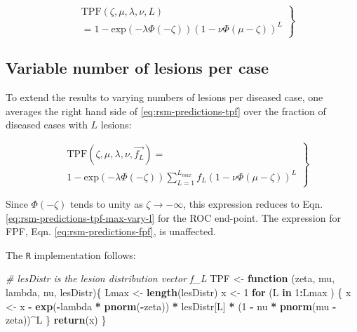 \documentclass[
]{book}
\newenvironment{Shaded}{\begin{snugshade}}{\end{snugshade}}
\newcommand{\CommentTok}[1]{\textcolor[rgb]{0.56,0.35,0.01}{\textit{#1}}}
\newcommand{\ControlFlowTok}[1]{\textcolor[rgb]{0.13,0.29,0.53}{\textbf{#1}}}
\newcommand{\DecValTok}[1]{\textcolor[rgb]{0.00,0.00,0.81}{#1}}
\newcommand{\KeywordTok}[1]{\textcolor[rgb]{0.13,0.29,0.53}{\textbf{#1}}}
\newcommand{\NormalTok}[1]{#1}
\newcommand{\OperatorTok}[1]{\textcolor[rgb]{0.81,0.36,0.00}{\textbf{#1}}}
\newcommand{\StringTok}[1]{\textcolor[rgb]{0.31,0.60,0.02}{#1}}
\begin{document}
\begin{equation}
\left.
\begin{aligned}
& \text{TPF}\left (\zeta , \mu, \lambda, \nu, L \right ) \\
&= 1 - \text{exp}\left ( - \lambda \Phi \left ( - \zeta \right )\right )
\left ( 1 - \nu \Phi \left ( \mu - \zeta \right ) \right )^L
\end{aligned}
\right \}
\label{eq:rsm-predictions-tpf}
\end{equation}

\hypertarget{rsm-predictions-tpf-varying-lesions}{%
\subsection{Variable number of lesions per case}\label{rsm-predictions-tpf-varying-lesions}}

To extend the results to varying numbers of lesions per diseased case, one averages the right hand side of \eqref{eq:rsm-predictions-tpf} over the fraction of diseased cases with \(L\) lesions:

\begin{equation}
\left.
\begin{aligned}
& \text{TPF}\left (\zeta , \mu, \lambda, \nu, \overrightarrow{f_L} \right ) =  \\
& 1 - \text{exp}\left ( -\lambda \Phi \left ( -\zeta \right )\right ) 
\sum_{L=1}^{L_{max}} f_L  \left ( 1 - \nu \Phi \left ( \mu -\zeta \right ) \right )^L 
\end{aligned}
\right \}
\label{eq:rsm-predictions-tpf2}
\end{equation}

Since \(\Phi \left ( -\zeta \right )\) tends to unity as \(\zeta \rightarrow -\infty\), this expression reduces to Eqn. \eqref{eq:rsm-predictions-tpf-max-vary-l} for the ROC end-point. The expression for FPF, Eqn. \eqref{eq:rsm-predictions-fpf}, is unaffected.

The \texttt{R} implementation follows:

\begin{Shaded}
\begin{Highlighting}[]
\CommentTok{# lesDistr is the lesion distribution vector f_L}
\NormalTok{TPF <-}\StringTok{ }\ControlFlowTok{function}\NormalTok{ (zeta, mu, lambda, nu, lesDistr)\{}
\NormalTok{  Lmax <-}\StringTok{ }\KeywordTok{length}\NormalTok{(lesDistr)}
\NormalTok{  x <-}\StringTok{ }\DecValTok{1}
  \ControlFlowTok{for}\NormalTok{ (L }\ControlFlowTok{in} \DecValTok{1}\OperatorTok{:}\NormalTok{Lmax ) \{}
\NormalTok{    x <-}\StringTok{ }\NormalTok{x }\OperatorTok{-}\StringTok{ }\KeywordTok{exp}\NormalTok{(}\OperatorTok{-}\NormalTok{lambda }\OperatorTok{*}\StringTok{ }\KeywordTok{pnorm}\NormalTok{(}\OperatorTok{-}\NormalTok{zeta)) }\OperatorTok{*}\StringTok{ }
\StringTok{      }\NormalTok{lesDistr[L] }\OperatorTok{*}\StringTok{ }\NormalTok{(}\DecValTok{1} \OperatorTok{-}\StringTok{ }\NormalTok{nu }\OperatorTok{*}\StringTok{ }\KeywordTok{pnorm}\NormalTok{(mu }\OperatorTok{-}\StringTok{ }\NormalTok{zeta))}\OperatorTok{^}\NormalTok{L}
\NormalTok{  \}}
  \KeywordTok{return}\NormalTok{(x)}
\NormalTok{\}}
\end{Highlighting}
\end{Shaded}
\end{document}
